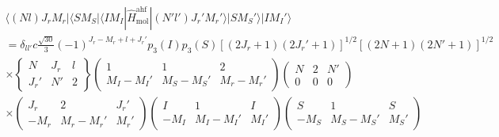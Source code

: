 \documentclass[a4paper]{article}
\newcommand{\threejm}[6]{ \left(\begin{array}{ccc} #1 & #3 & #5\\
    #2 & #4 & #6
\end{array}
\right)}
\newcommand{\sixj}[6]{ \left\{\begin{array}{ccc} #1 & #3 & #5\\
    #2 & #4 & #6
\end{array}
\right\}}
\begin{document}
\begin{multline}\label{mel_Hmol_term3ahf}
    \langle (Nl)J_rM_r | \langle S M_S | \langle IM_I | \hat{H}_\text{mol}^\text{ahf} | (N'l')J_r'M_r' \rangle | SM_S'\rangle |IM_I'\rangle 
    \\ =  \delta_{ll'} c\frac{\sqrt{30}}{3} (-1)^{J_r-M_r+l+J_r'}
    p_3(I) p_3(S) [(2J_r+1)(2J_r'+1)]^{1/2} [(2N+1)(2N'+1)]^{1/2} 
    \\ \times\sixj{N}{J_r'}{J_r}{N'}{l}{2}  \threejm{1}{M_I-M_I'}{1}{M_S-M_S'}{2}{M_r-M_r'} \threejm{N}{0}{2}{0}{N'}{0} 
    \\ \times \threejm{J_r}{-M_r}{2}{M_r-M_r'}{J_r'}{M_r'}
    \threejm{I}{-M_I}{1}{M_I-M_I'}{I}{M_I'}
    \threejm{S}{-M_S}{1}{M_S-M_S'}{S}{M_S'}
\end{multline}
\end{document}
